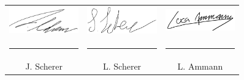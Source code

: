 \documentclass[a4paper,12pt]{report}
\begin{document}
    \vspace{1cm}

    \begin{center}
        \begin{tabular}{c c c}
            \includegraphics[width=3cm]{assets/signature1} &
            \includegraphics[width=3cm]{assets/signature2} &
            \includegraphics[width=3cm]{assets/signature3} \\
            \rule{3cm}{0.4pt} & \rule{3cm}{0.4pt} & \rule{3cm}{0.4pt} \\
            J. Scherer        & L. Scherer        & L. Ammann
        \end{tabular}
    \end{center}
\end{document}
